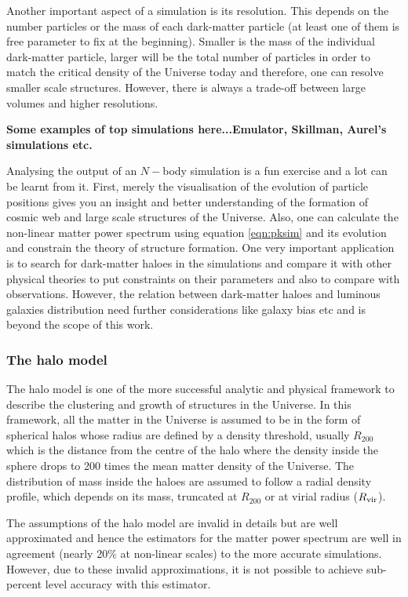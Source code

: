 Another important aspect of a simulation is its resolution. This depends on the number 
particles or the mass of each dark-matter particle (at least one of them is free parameter 
to fix at the beginning). Smaller is the mass of the individual dark-matter particle, 
larger will be the total number of particles in order to match the critical density of 
the Universe today and therefore, one can resolve smaller scale structures. However, 
there is always a trade-off between large volumes and higher resolutions. 

{\bf Some examples of top simulations here...Emulator, Skillman, Aurel's simulations etc.} 

Analysing the output of an $N-$body simulation is a fun exercise and a lot can be learnt
from it. First, merely the visualisation of the evolution of particle positions gives
you an insight and better understanding of the formation of cosmic web and large
scale structures of the Universe. 
Also, one can calculate the non-linear matter power spectrum using equation \ref{eqn:pksim} and its
evolution and constrain the theory of structure formation. One very important
application is to search for dark-matter haloes in the simulations and compare
it with other physical theories to put constraints on their parameters and also
to compare with observations. However, the relation between dark-matter haloes
and luminous galaxies distribution need further considerations like galaxy 
bias etc and is beyond the scope of this work. 

\subsubsection{The halo model}

The halo model is one of the more successful analytic and physical framework to describe
the clustering and growth of structures in the Universe. In this framework, all the matter
in the Universe is assumed to be in the form of spherical halos whose radius are defined by a 
density threshold, usually $R_{200}$ which is the distance from the centre of the halo where
the density inside the sphere drops to 200 times the mean matter density of the Universe. 
The  distribution of mass inside the haloes are assumed to follow a radial density 
profile, which depends on its mass, truncated at $R_{200}$ or at virial 
radius ($R_{\rm vir}$).

The assumptions of the halo model are invalid in details but are well approximated and 
hence the estimators for the matter power spectrum are well in agreement 
(nearly 20$\%$ at non-linear scales)
to the more accurate simulations. However, due to these invalid approximations, it is not
possible to achieve sub-percent level accuracy with this estimator. 

